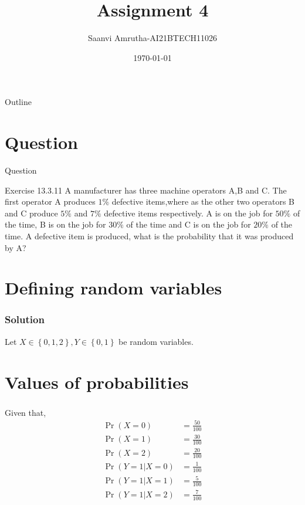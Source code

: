 \documentclass{beamer}
\title{Assignment 4}
\author{Saanvi Amrutha-AI21BTECH11026}
\date{\today}
\providecommand{\pr}[1]{\ensuremath{\Pr\left(#1\right)}}
\providecommand{\cbrak}[1]{\ensuremath{\left\{#1\right\}}}
\begin{document}
\begin{frame}
    \titlepage 
\end{frame}

\logo{}

\begin{frame}{Outline}
    \tableofcontents
\end{frame}

\section{Question}
\begin{frame}{Question}
    \begin{block}{Exercise 13.3.11}
        A manufacturer has three machine operators A,B and C. The first operator A produces $1\%$ defective items,where as the other two operators B and C produce $5\%$ and $7\%$ defective items respectively. A is on the job for $50\%$ of the time, B is on the job for $30\%$ of the time and C is on the job for $20\%$ of the time. A defective item is produced, what is the probability that it was produced by A?
    \end{block}
\end{frame}

\section{Defining random variables}
\begin{frame}
\frametitle{Solution}
Let $X\in\cbrak{0,1,2},Y\in\cbrak{0,1}$ be random variables.\\
\begin{table}[h]
\begin{center}
    
	\vspace{5pt}
\caption{}
\label{table:table1}
\end{center}
\end{table}
\end{frame}

\section{Values of probabilities}
\begin{frame}
\frametitle{}
Given that,
\begin{align}
\pr{X=0}&=\frac{50}{100}\label{eq:eq1}\\
\pr{X=1}&=\frac{30}{100}\\
\pr{X=2}&=\frac{20}{100}\\
\pr{Y=1|X=0}&=\frac{1}{100}\label{eq:eq2}\\
\pr{Y=1|X=1}&=\frac{5}{100}\\
\pr{Y=1|X=2}&=\frac{7}{100}
\end{align}
\end{frame}
\end{document}
